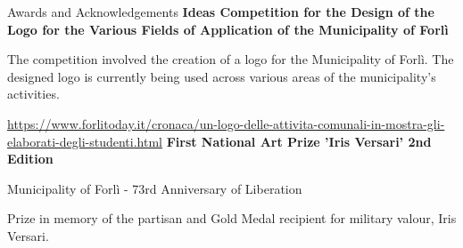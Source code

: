 \begin{rubric}{Awards and Acknowledgements}
\entry*[23/05/2018] \textbf{Ideas Competition for the Design of the Logo for the Various Fields of Application of the Municipality of Forlì}
    \par The competition involved the creation of a logo for the Municipality of Forlì. The designed logo is currently being used across various areas of the municipality's activities.
    \par \url{https://www.forlitoday.it/cronaca/un-logo-delle-attivita-comunali-in-mostra-gli-elaborati-degli-studenti.html}
%
\entry*[25/04/2018] \textbf{First National Art Prize 'Iris Versari' 2nd Edition} 
    \par Municipality of Forlì - 73rd Anniversary of Liberation
    \par Prize in memory of the partisan and Gold Medal recipient for military valour, Iris Versari.

\end{rubric}